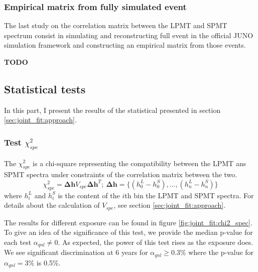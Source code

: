 \documentclass[../main.tex]{subfiles}
\begin{document}
\subsubsection{Empirical matrix from fully simulated event}

The last study on the correlation matrix between the LPMT and SPMT spectrum consist in simulating and reconstructing full event in the official JUNO simulation framework and constructing an empirical matrix from those events.

\textbf{TODO}


\subsection{Statistical tests}

In this part, I present the results of the statistical presented in section \ref{sec:joint_fit:approach}.

\subsubsection{Test $\chi^2_{spe}$}

The $\chi^2_{spe}$ is a chi-square representing the compatibility between the LPMT ans SPMT spectra under constraints of the correlation matrix between the two.
\begin{equation}
  \chi^2_{spe} = \bm{\Delta h} V_{spe} \bm{\Delta h}^T; ~ \bm{\Delta h} = \{ (h_0^L - h_0^S), ..., (h_n^L - h_n^S) \}
\end{equation}
where $h_i^L$ and $h_i^S$ is the content of the $i$th bin the LPMT and SPMT spectra. For details about the calculation of $V_{spe}$, see section \ref{sec:joint_fit:approach}.

The results for different exposure can be found in figure \ref{fig:joint_fit:chi2_spec}. To give an idea of the significance of this test, we provide the median p-value for each test $\alpha_{qnl} \neq 0$. As expected, the power of this test rises as the exposure does. We see significant discrimination at 6 years for $\alpha_{qnl} \geq 0.3 \%$ where the p-value for $\alpha_{qnl} = 3\%$ is 0.5\%.
\end{document}
